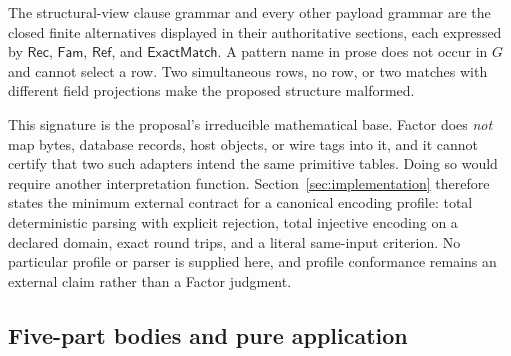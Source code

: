 \documentclass[11pt,twoside]{article}
\newcommand{\Rec}{\mathsf{Rec}}
\newcommand{\Fam}{\mathsf{Fam}}
\newcommand{\RefPos}{\mathsf{Ref}}
\newcommand{\ExactMatch}{\mathsf{ExactMatch}}
\begin{document}
The structural-view clause grammar and every other payload grammar are the closed
finite alternatives displayed in their authoritative sections, each expressed by
\(\Rec\), \(\Fam\), \(\RefPos\), and \(\ExactMatch\).  A pattern name in prose
does not occur in \(G\) and cannot select a row.  Two simultaneous rows, no row,
or two matches with different field projections make the proposed structure
malformed.

This signature is the proposal's irreducible mathematical base.  Factor does
\emph{not} map bytes, database records, host objects, or wire tags into it, and it
cannot certify that two such adapters intend the same primitive tables.  Doing so
would require another interpretation function.  Section~\ref{sec:implementation}
therefore states the minimum external contract for a canonical encoding profile:
total deterministic parsing with explicit rejection, total injective encoding on
a declared domain, exact round trips, and a literal same-input criterion.  No
particular profile or parser is supplied here, and profile conformance remains an
external claim rather than a Factor judgment.

\subsection*{Five-part bodies and pure application}
\end{document}
